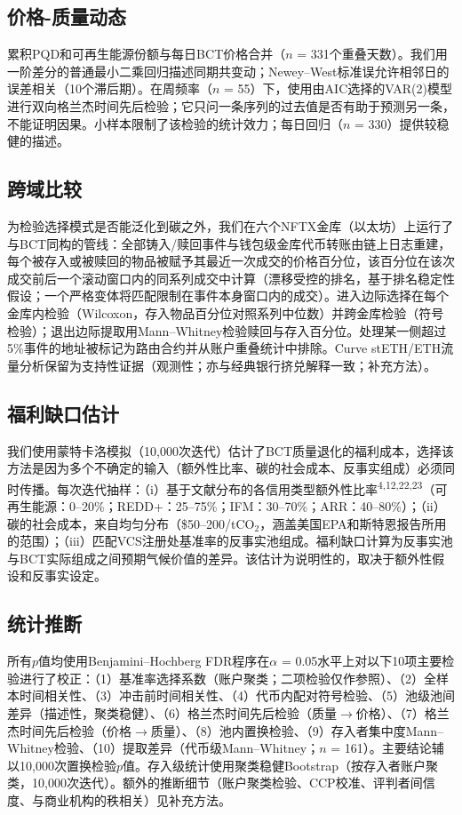 \documentclass[12pt,a4paper]{article}
\begin{document}
\subsection*{价格-质量动态}

累积PQD和可再生能源份额与每日BCT价格合并（$n$ = 331个重叠天数）。我们用一阶差分的普通最小二乘回归描述同期共变动；Newey--West标准误允许相邻日的误差相关（10个滞后期）。在周频率（$n$ = 55）下，使用由AIC选择的VAR(2)模型进行双向格兰杰时间先后检验；它只问一条序列的过去值是否有助于预测另一条，不能证明因果。小样本限制了该检验的统计效力；每日回归（$n$ = 330）提供较稳健的描述。

\subsection*{跨域比较}

为检验选择模式是否能泛化到碳之外，我们在六个NFTX金库（以太坊）上运行了与BCT同构的管线：全部铸入/赎回事件与钱包级金库代币转账由链上日志重建，每个被存入或被赎回的物品被赋予其最近一次成交的价格百分位，该百分位在该次成交前后一个滚动窗口内的同系列成交中计算（漂移受控的排名，基于排名稳定性假设；一个严格变体将匹配限制在事件本身窗口内的成交）。进入边际选择在每个金库内检验（Wilcoxon，存入物品百分位对照系列中位数）并跨金库检验（符号检验）；退出边际提取用Mann--Whitney检验赎回与存入百分位。处理某一侧超过5\%事件的地址被标记为路由合约并从账户重叠统计中排除。Curve stETH/ETH流量分析保留为支持性证据（观测性；亦与经典银行挤兑解释一致；补充方法）。

\subsection*{福利缺口估计}

我们使用蒙特卡洛模拟（10,000次迭代）估计了BCT质量退化的福利成本，选择该方法是因为多个不确定的输入（额外性比率、碳的社会成本、反事实组成）必须同时传播。每次迭代抽样：（i）基于文献分布的各信用类型额外性比率\textsuperscript{4,12,22,23}（可再生能源：0--20\%；REDD+：25--75\%；IFM：30--70\%；ARR：40--80\%）；（ii）碳的社会成本，来自均匀分布（\$50--200/tCO$_2$，涵盖美国EPA和斯特恩报告所用的范围）；（iii）匹配VCS注册处基准率的反事实池组成。福利缺口计算为反事实池与BCT实际组成之间预期气候价值的差异。该估计为说明性的，取决于额外性假设和反事实设定。

\subsection*{统计推断}

所有$p$值均使用Benjamini--Hochberg FDR程序在$\alpha$ = 0.05水平上对以下10项主要检验进行了校正：（1）基准率选择系数（账户聚类；二项检验仅作参照）、（2）全样本时间相关性、（3）冲击前时间相关性、（4）代币内配对符号检验、（5）池级池间差异（描述性，聚类稳健）、（6）格兰杰时间先后检验（质量$\rightarrow$价格）、（7）格兰杰时间先后检验（价格$\rightarrow$质量）、（8）池内置换检验、（9）存入者集中度Mann--Whitney检验、（10）提取差异（代币级Mann--Whitney；$n$ = 161）。主要结论辅以10,000次置换检验$p$值。存入级统计使用聚类稳健Bootstrap（按存入者账户聚类，10,000次迭代）。额外的推断细节（账户聚类检验、CCP校准、评判者间信度、与商业机构的秩相关）见补充方法。
\end{document}
